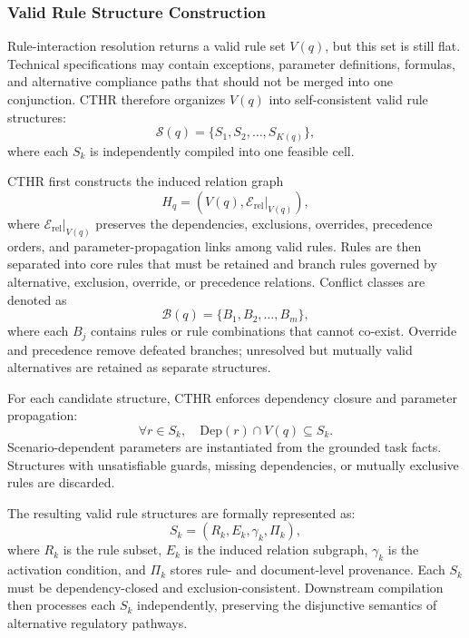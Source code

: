 ﻿\documentclass[a4paper,fleqn]{cas-dc}
\begin{document}
\subsubsection{Valid Rule Structure Construction}
\label{sec:valid_rule_structure_construction}

Rule-interaction resolution returns a valid rule set $V(q)$, but this set is still flat. Technical specifications may contain exceptions, parameter definitions, formulas, and alternative compliance paths that should not be merged into one conjunction. CTHR therefore organizes $V(q)$ into self-consistent valid rule structures:
\begin{equation}
\mathcal{S}(q) = \{S_1, S_2, \ldots, S_{K(q)}\},
\end{equation}
where each $S_k$ is independently compiled into one feasible cell.

CTHR first constructs the induced relation graph
\begin{equation}
H_q = (V(q), \mathcal{E}_{\mathrm{rel}}|_{V(q)}),
\end{equation}
where $\mathcal{E}_{\mathrm{rel}}|_{V(q)}$ preserves the dependencies, exclusions, overrides, precedence orders, and parameter-propagation links among valid rules. Rules are then separated into core rules that must be retained and branch rules governed by alternative, exclusion, override, or precedence relations. Conflict classes are denoted as
\begin{equation}
\mathcal{B}(q) = \{B_1, B_2, \ldots, B_m\},
\end{equation}
where each $B_j$ contains rules or rule combinations that cannot co-exist. Override and precedence remove defeated branches; unresolved but mutually valid alternatives are retained as separate structures.

For each candidate structure, CTHR enforces dependency closure and parameter propagation:
\begin{equation}
\forall r \in S_k, \quad \mathrm{Dep}(r) \cap V(q) \subseteq S_k.
\end{equation}
Scenario-dependent parameters are instantiated from the grounded task facts. Structures with unsatisfiable guards, missing dependencies, or mutually exclusive rules are discarded.

The resulting valid rule structures are formally represented as:
\begin{equation}
S_k = (R_k, E_k, \gamma_k, \Pi_k),
\end{equation}
where $R_k$ is the rule subset, $E_k$ is the induced relation subgraph, $\gamma_k$ is the activation condition, and $\Pi_k$ stores rule- and document-level provenance. Each $S_k$ must be dependency-closed and exclusion-consistent. Downstream compilation then processes each $S_k$ independently, preserving the disjunctive semantics of alternative regulatory pathways.
\end{document}
